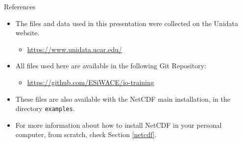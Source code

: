 \documentclass[compress,11pt,xcolor=svgnames,aspectratio=169]{beamer}
\begin{document}
\begin{frame}[fragile]{References}

\begin{itemize}
\setlength\itemsep{0.6cm}

  \item The files and data used in this presentation were collected on the Unidata website.

    \begin{itemize}
    \item \url{https://www.unidata.ucar.edu/}
    \end{itemize}

  \item All files used here are available in the following Git Repository:

    \begin{itemize}
    \item \url{https://github.com/ESiWACE/io-training}
    \end{itemize}

  \item These files are also available with the NetCDF main installation, in the directory \texttt{examples}.

  \item For more information about how to install NetCDF in your personal computer, from scratch, check Section \ref{netcdf}.

\end{itemize}

\end{frame}
\end{document}
